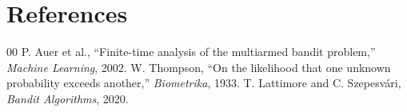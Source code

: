 \documentclass[conference]{IEEEtran}
\begin{document}
\section{References}
\begin{thebibliography}{00}
 P. Auer et al., ``Finite-time analysis of the multiarmed bandit problem,'' \emph{Machine Learning}, 2002.
 W. Thompson, ``On the likelihood that one unknown probability exceeds another,'' \emph{Biometrika}, 1933.
 T. Lattimore and C. Szepesvári, \emph{Bandit Algorithms}, 2020.
\end{thebibliography}
\end{document}
